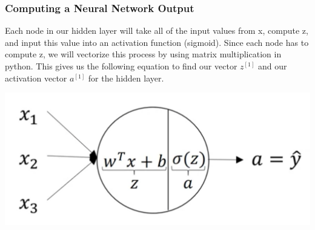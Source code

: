 \documentclass[11pt, a4paper]{article}
\begin{document}
\begin{spacing}{1.1}
	\subsubsection{Computing a Neural Network Output}
	\begin{minipage}[c]{9cm}
	Each node in our hidden layer will take all of the input values from x, compute z, and input this value into an activation function (sigmoid). Since each node has to compute z, we will vectorize this process by using matrix multiplication in python. This gives us the following equation to find our vector $z^{[1]}$ and our activation vector $a^{[1]}$ for the hidden layer.
	\end{minipage}
	\begin{minipage}[c]{5cm}
	\includegraphics[scale=0.4]{act_func}
	\end{minipage} \vspace*{4mm} \\

\end{spacing}
\end{document}
